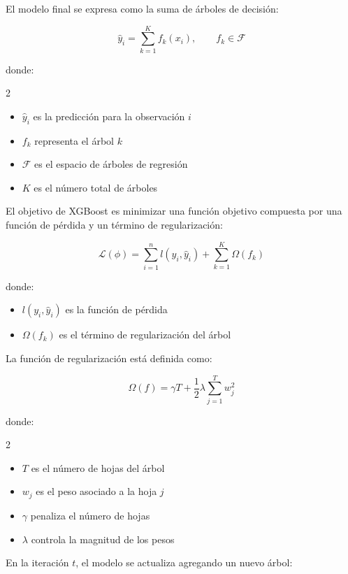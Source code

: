 El modelo final se expresa como la suma de árboles de decisión:

\begin{equation}
\hat{y}_i = \sum_{k=1}^{K} f_k(x_i), \qquad f_k \in \mathcal{F}
\end{equation}

donde:
\begin{multicols}{2}
\begin{itemize}
\item $\hat{y}_i$ es la predicción para la observación $i$
\item $f_k$ representa el árbol $k$
\item $\mathcal{F}$ es el espacio de árboles de regresión
\item $K$ es el número total de árboles
\end{itemize}
\end{multicols}


El objetivo de XGBoost es minimizar una función objetivo compuesta por una función de pérdida y un término de regularización:

\begin{equation}
\mathcal{L}(\phi) = \sum_{i=1}^{n} l(y_i,\hat{y}_i) + \sum_{k=1}^{K} \Omega(f_k)
\end{equation}

donde:

\begin{itemize}
\item $l(y_i,\hat{y}_i)$ es la función de pérdida
\item $\Omega(f_k)$ es el término de regularización del árbol
\end{itemize}

La función de regularización está definida como:

\begin{equation}
\Omega(f) = \gamma T + \frac{1}{2}\lambda \sum_{j=1}^{T} w_j^2
\end{equation}

donde:
\begin{multicols}{2}
\begin{itemize}
\item $T$ es el número de hojas del árbol
\item $w_j$ es el peso asociado a la hoja $j$
\item $\gamma$ penaliza el número de hojas
\item $\lambda$ controla la magnitud de los pesos
\end{itemize}
\end{multicols}
En la iteración $t$, el modelo se actualiza agregando un nuevo árbol:

